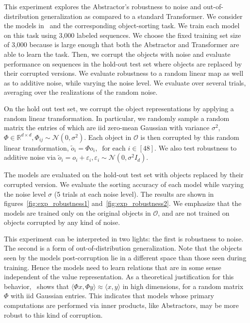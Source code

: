
This experiment explores the Abstractor's robustness to noise and out-of-distribution generalization as compared to a standard Transformer. We consider the models in~ and the corresponding object-sorting task. We train each model on this task using 3,000 labeled sequences. We choose the fixed training set size of 3,000 because is large enough that both the Abstractor and Transformer are able to learn the task. Then, we corrupt the objects with noise and evaluate performance on sequences in the hold-out test set where objects are replaced by their corrupted versions. We evaluate robustness to a random linear map as well as to additive noise, while varying the noise level. We evaluate over several trials, averaging over the realizations of the random noise.

On the hold out test set, we corrupt the object representations by applying a random linear transformation. In particular, we randomly sample a random matrix the entries of which are iid zero-mean Gaussian with variance $\sigma^2$, $\Phi \in \mathbb{R}^{d \times d}, \Phi_{ij} \sim \mathcal{N}(0, \sigma^2)$. Each object in $\mathcal{O}$ is then corrupted by this random linear transformation, $\tilde{o}_i = \Phi o_i, \ \text{ for each } i \in [48]$. We also test robustness to additive noise via $\tilde{o}_i = o_i + \varepsilon_i, \varepsilon_i \sim \mathcal{N}(0, \sigma^2 I_d)$.

The models are evaluated on the hold-out test set with objects replaced by their corrupted version. We evaluate the sorting accuracy of each model while varying the noise level $\sigma$ (5 trials at each noise level). The results are shown in figures~\ref{fig:exp_robustness1} and~\ref{fig:exp_robustness2}. We emphasize that the models are trained only on the original objects in $\mathcal{O}$, and are not trained on objects corrupted by any kind of noise.

This experiment can be interpreted in two lights: the first is robustness to noise. The second is a form of out-of-distribution generalization. Note that the objects seen by the models post-corruption lie in a different space than those seen during training. Hence the models need to learn relations that are in some sense independent of the value representation. As a theoretical justification for this behavior,~\cite{zhouCompressedPrivacySensitive2009} shows that $\langle \Phi x, \Phi y \rangle \approx \langle x, y \rangle$ in high dimensions, for a random matrix $\Phi$ with iid Gaussian entries. This indicates that models whose primary computations are performed via inner products, like Abstractors, may be more robust to this kind of corruption.

